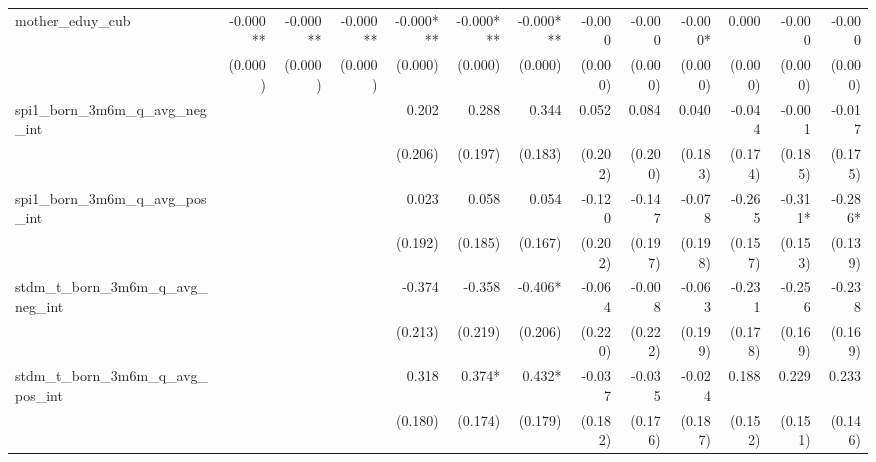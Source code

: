 \begin{tabular}{lrrrrrrrrrrrr}
mother\_eduy\_cub                           &     -0.000** &     -0.000** &     -0.000** &    -0.000*** &    -0.000*** &    -0.000*** &       -0.000 &       -0.000 &      -0.000* &        0.000 &       -0.000 &       -0.000 \\ 
                                            &      (0.000) &      (0.000) &      (0.000) &      (0.000) &      (0.000) &      (0.000) &      (0.000) &      (0.000) &      (0.000) &      (0.000) &      (0.000) &      (0.000) \\ 
spi1\_born\_3m6m\_q\_avg\_neg\_int          &              &              &              &        0.202 &        0.288 &        0.344 &        0.052 &        0.084 &        0.040 &       -0.044 &       -0.001 &       -0.017 \\ 
                                            &              &              &              &      (0.206) &      (0.197) &      (0.183) &      (0.202) &      (0.200) &      (0.183) &      (0.174) &      (0.185) &      (0.175) \\ 
spi1\_born\_3m6m\_q\_avg\_pos\_int          &              &              &              &        0.023 &        0.058 &        0.054 &       -0.120 &       -0.147 &       -0.078 &       -0.265 &      -0.311* &      -0.286* \\ 
                                            &              &              &              &      (0.192) &      (0.185) &      (0.167) &      (0.202) &      (0.197) &      (0.198) &      (0.157) &      (0.153) &      (0.139) \\ 
stdm\_t\_born\_3m6m\_q\_avg\_neg\_int       &              &              &              &       -0.374 &       -0.358 &      -0.406* &       -0.064 &       -0.008 &       -0.063 &       -0.231 &       -0.256 &       -0.238 \\ 
                                            &              &              &              &      (0.213) &      (0.219) &      (0.206) &      (0.220) &      (0.222) &      (0.199) &      (0.178) &      (0.169) &      (0.169) \\ 
stdm\_t\_born\_3m6m\_q\_avg\_pos\_int       &              &              &              &        0.318 &       0.374* &       0.432* &       -0.037 &       -0.035 &       -0.024 &        0.188 &        0.229 &        0.233 \\ 
                                            &              &              &              &      (0.180) &      (0.174) &      (0.179) &      (0.182) &      (0.176) &      (0.187) &      (0.152) &      (0.151) &      (0.146) \\ 

\end{tabular}
